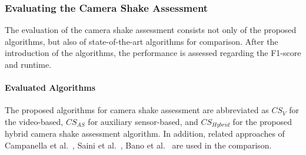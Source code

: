 \subsubsection{Evaluating the Camera Shake Assessment}
The evaluation of the camera shake assessment consists not only of the proposed algorithms, but also of state-of-the-art algorithms for comparison.
After the introduction of the algorithms, the performance is assessed regarding the F1-score and runtime.
\paragraph{Evaluated Algorithms}
The proposed algorithms for camera shake assessment are abbreviated as $CS_{V}$ for the video-based, $CS_{AS}$ for auxiliary sensor-based, and $CS_{Hybrid}$ for the proposed hybrid camera shake assessment algorithm.
In addition, related approaches of Campanella et al.~\cite{Campanella2007}, Saini et al.~\cite{Saini2012}, Bano et al.~\cite{Bano2015} are used in the comparison. 
